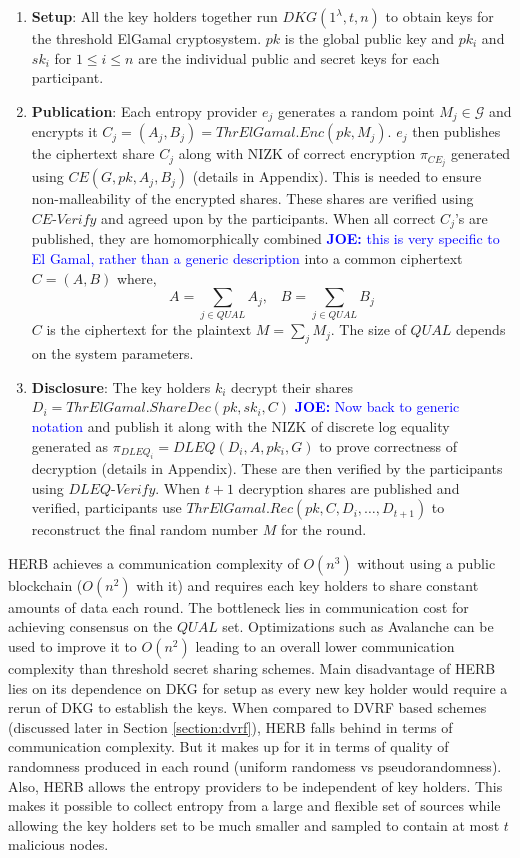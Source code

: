 \documentclass[letterpaper,twocolumn,10pt]{article}
\theoremstyle{definition}
\theoremstyle{remark}
\newcommand{\joenote}[1]{\textcolor{blue}{\textbf{JOE:} #1}}
\begin{document}
\begin{enumerate}
    \item \textbf{Setup}: All the key holders together run $DKG(1^\lambda, t, n)$ to obtain keys for the threshold ElGamal cryptosystem. $pk$ is the global public key and $pk_i$ and $sk_i$ for $1 \le i \le n$ are the individual public and secret keys for each participant.
    
    \item \textbf{Publication}: Each entropy provider $e_j$ generates a random point $M_j \in \mathcal{G}$ and encrypts it $C_j = (A_j, B_j) = ThrElGamal.Enc(pk, M_j)$. $e_j$ then publishes the ciphertext share $C_j$ along with NIZK of correct encryption $\pi_{CE_{j}}$ generated using $CE(G, pk, A_j, B_j)$ (details in Appendix). This is needed to ensure non-malleability of the encrypted shares. These shares are verified using $CE\text{-}Verify$ and agreed upon by the participants. When all correct $C_j$'s are published, they are homomorphically combined \joenote{this is very specific to El Gamal, rather than a generic description} into a common ciphertext $C = (A, B)$ where,
    $$ A = \sum_{j \in QUAL} A_j,\;\;\; B = \sum_{j \in QUAL} B_j$$
     $C$ is the ciphertext for the plaintext $M = \sum_{j} M_j$. The size of $QUAL$ depends on the system parameters.
    
    \item \textbf{Disclosure}: The key holders $k_i$ decrypt their shares $D_i = ThrElGamal.ShareDec(pk, sk_i, C)$ \joenote{Now back to generic notation} and publish it along with the NIZK of discrete log equality generated as $\pi_{DLEQ_{i}} = DLEQ(D_i, A, pk_i, G)$ to prove correctness of decryption (details in Appendix). These are then verified by the participants using $DLEQ\text{-}Verify$. When $t+1$ decryption shares are published and verified, participants use $ThrElGamal.Rec(pk, C, D_i, \ldots, D_{t+1})$ to reconstruct the final random number $M$ for the round.
\end{enumerate}
HERB achieves a communication complexity of $O(n^3)$ without using a public blockchain ($O(n^2)$ with it) and requires each key holders to share constant amounts of data each round. The bottleneck lies in communication cost for achieving consensus on the $QUAL$ set. Optimizations such as Avalanche \cite{rocket2018snowflake} can be used to improve it to $O(n^2)$ leading to an overall lower communication complexity than threshold secret sharing schemes. Main disadvantage of HERB lies on its dependence on DKG for setup as every new key holder would require a rerun of DKG to establish the keys. When compared to DVRF based schemes (discussed later in Section \ref{section:dvrf}), HERB falls behind in terms of communication complexity. But it makes up for it in terms of quality of randomness produced in each round (uniform randomess vs pseudorandomness). Also, HERB allows the entropy providers to be independent of key holders. This makes it possible to collect entropy from a large and flexible set of sources while allowing the key holders set to be much smaller and sampled to contain at most $t$ malicious nodes.
\end{document}
